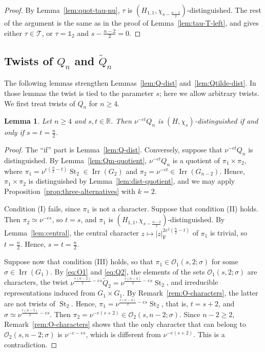 \documentclass[11pt]{amsart}
\numberwithin{equation}{section}
\theoremstyle{plain}
\newtheorem{lemma}[theorem]{Lemma}
\theoremstyle{definition}
\theoremstyle{remark}
\newcommand{\R}{\mathbb{R}}
\newcommand{\one}{\mathds{1}}
\newcommand{\T}{\mathcal{T}}
\DeclareMathOperator{\Irr}{Irr}
\DeclareMathOperator{\St}{St}
\newcommand{\Qt}{\widetilde{Q}}
\begin{document}
\begin{proof}
	By Lemma~\ref{lem:quot-tau-nu}, $\tau$ is $(H_{1,1},\chi_{s-\frac{n-2}2})$-distinguished. The rest of the argument is the same as in the proof of Lemma~\ref{lem:tau-T-left}, and gives either $\tau\in\T$, or $\tau=\one_2$ and $s-\frac{n-2}2=0$.
\end{proof}

\subsection{Twists of \texorpdfstring{$Q_n$}{Qn} and \texorpdfstring{$\widetilde Q_n$}{Q~n}}\label{ss:Qn-twists}

The following lemmas strengthen Lemmas~\ref{lem:Q-dist} and~\ref{lem:Qtilde-dist}. In those lemmas the twist is tied to the parameter $s$; here we allow arbitrary twists. We first treat twists of $Q_n$ for $n\ge4$.

\begin{lemma}\label{lem:Qn-twist-dist}
	Let $n\ge4$ and $s,t\in\R$. Then $\nu^{-et}Q_n$ is $(H,\chi_s)$-distinguished if and only if $s=t=\frac n2$.
\end{lemma}

\begin{proof}
	The ``if'' part is Lemma~\ref{lem:Q-dist}. Conversely, suppose that $\nu^{-et}Q_n$ is distinguished. By Lemma~\ref{lem:Qm-quotient}, $\nu^{-et}Q_n$ is a quotient of $\pi_1\times\pi_2$, where $\pi_1=\nu^{e(\frac n2-t)}\St_2\in\Irr(G_2)$ and $\pi_2=\nu^{-et}\in\Irr(G_{n-2})$. Hence, $\pi_1\times\pi_2$ is distinguished by Lemma~\ref{lem:dist-quotient}, and we may apply Proposition~\ref{prop:three-alternatives} with $k=2$.
	
	Condition (I) fails, since $\pi_1$ is not a character. Suppose that condition (II) holds. Then $\pi_2\simeq\nu^{-es}$, so $t=s$, and $\pi_1$ is $(H_{1,1},\chi_{s-\frac{n-2}2})$-distinguished. By Lemma~\ref{lem:central}, the central character $z\mapsto|z|_{\mathrm{F}}^{2e^2(\frac n2-t)}$ of $\pi_1$ is trivial, so $t=\frac n2$. Hence, $s=t=\frac n2$.
	
	Suppose now that condition (III) holds, so that $\pi_1\in\mathcal O_1(s,2;\sigma)$ for some $\sigma\in\Irr(G_1)$. By \eqref{eq:O1} and \eqref{eq:Q2}, the elements of the sets $\mathcal O_1(s,2;\sigma)$ are characters, the twist $\nu^{\frac{e(n-2)}2-es}\Qt_2=\nu^{\frac{e(n-4)}2-es}\St_2$, and irreducible representations induced from $G_1\times G_1$. By Remark~\ref{rem:O-characters}, the latter are not twists of $\St_2$. Hence, $\pi_1=\nu^{\frac{e(n-4)}2-es}\St_2$, that is, $t=s+2$, and $\sigma\simeq\nu^{\frac{e(n-5)}2-es}$. Then $\pi_2=\nu^{-e(s+2)}\in\mathcal O_2(s,n-2;\sigma)$. Since $n-2\ge2$, Remark~\ref{rem:O-characters} shows that the only character that can belong to $\mathcal O_2(s,n-2;\sigma)$ is $\nu^{-e-es}$, which is different from $\nu^{-e(s+2)}$. This is a contradiction.
\end{proof}
\end{document}

